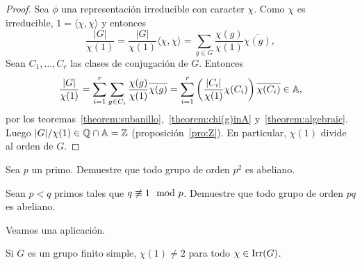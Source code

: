 \begin{proof}
  Sea $\phi$ una representación irreducible con caracter $\chi$. Como $\chi$ es
  irreducible, $1=\langle\chi,\chi\rangle$ y entonces 
  \[
    \frac{|G|}{\chi(1)}=\frac{|G|}{\chi(1)}\langle\chi,\chi\rangle=\sum_{g\in G}\frac{\chi(g)}{\chi(1)}\overline{\chi(g)},
  \]
  Sean $C_1,\dots,C_r$ las clases de conjugación de $G$. Entonces
  \[
    \frac{|G|}{\chi(1)}
    =\sum_{i=1}^r\sum_{g\in C_i}\frac{\chi(g)}{\chi(1)}\overline{\chi(g)}
    =\sum_{i=1}^r\left(\frac{|C_i|}{\chi(1)}\chi(C_i)\right)\overline{\chi(C_i)}\in\mathbb{A},
  \]
  por los teoremas~\ref{theorem:subanillo},~\ref{theorem:chi(g)inA}
  y~\ref{theorem:algebraic}.  Luego $|G|/\chi(1)\in\mathbb{Q}\cap\mathbb{A}=\mathbb{Z}$
  (proposición~\ref{pro:Z}). En particular, $\chi(1)$ divide al orden de $G$.
\end{proof}

\begin{exercise}
	\label{xca:p2_abeliano}
  Sea $p$ un primo. Demuestre que todo grupo de orden $p^2$ es abeliano.
\end{exercise}

\begin{exercise}
	\label{xca:pq}
  Sean $p<q$ primos tales que $q\centernot\equiv1\mod p$. Demuestre que todo grupo de
  orden $pq$ es abeliano.
\end{exercise}

Veamos una aplicación.

\begin{theorem}
    Si $G$ es un grupo finito simple, $\chi(1)\ne 2$ para todo $\chi\in\operatorname{Irr}(G)$. 
\end{theorem}

